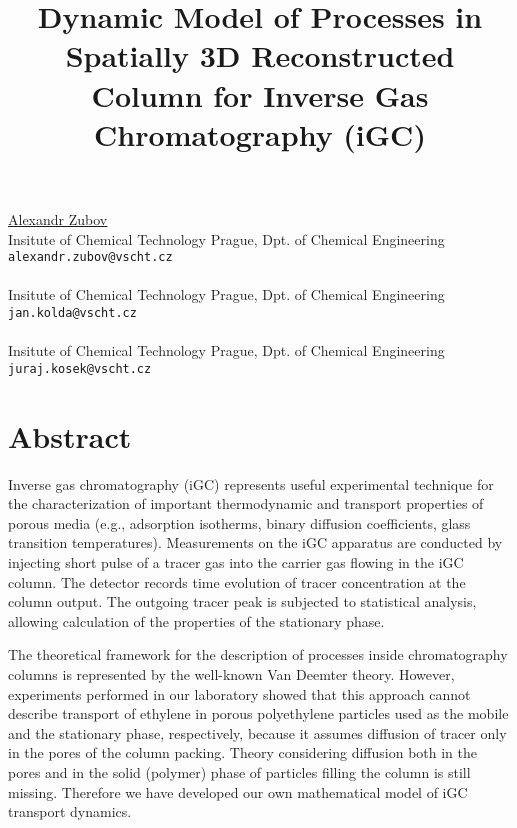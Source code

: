 \title{Dynamic Model of Processes in Spatially 3D Reconstructed Column for Inverse Gas Chromatography (iGC)}
 \author{} \institute{}
\maketitle
\begin{center}
{\large \underline{Alexandr Zubov}}\\
Insitute of Chemical Technology Prague, Dpt. of Chemical Engineering\\
{\tt alexandr.zubov@vscht.cz}
\\ \vspace{4mm}{\large Jan Kolda}\\
Insitute of Chemical Technology Prague, Dpt. of Chemical Engineering\\
{\tt jan.kolda@vscht.cz}
\\ \vspace{4mm}{\large Juraj Kosek}\\
Insitute of Chemical Technology Prague, Dpt. of Chemical Engineering\\
{\tt juraj.kosek@vscht.cz}

\end{center}

\section*{Abstract}

Inverse gas chromatography (iGC) represents useful experimental technique for the characterization of important thermodynamic and transport properties of porous media (e.g., adsorption isotherms, binary diffusion coefficients, glass transition temperatures). Measurements on the iGC apparatus are conducted by injecting short pulse of a tracer gas into the carrier gas flowing in the iGC column. The detector records time evolution of tracer concentration at the column output. The outgoing tracer peak is subjected to statistical analysis, allowing calculation of the properties of the stationary phase.

The theoretical framework for the description of processes inside chromatography columns is represented by the well-known Van Deemter theory. However, experiments performed in our laboratory showed that this approach cannot describe transport of ethylene in porous polyethylene particles used as the mobile and the stationary phase, respectively, because it assumes diffusion of tracer only in the pores of the column packing. Theory considering diffusion both in the pores and in the solid (polymer) phase of particles filling the column is still missing. Therefore we have developed our own mathematical model of iGC transport dynamics.

